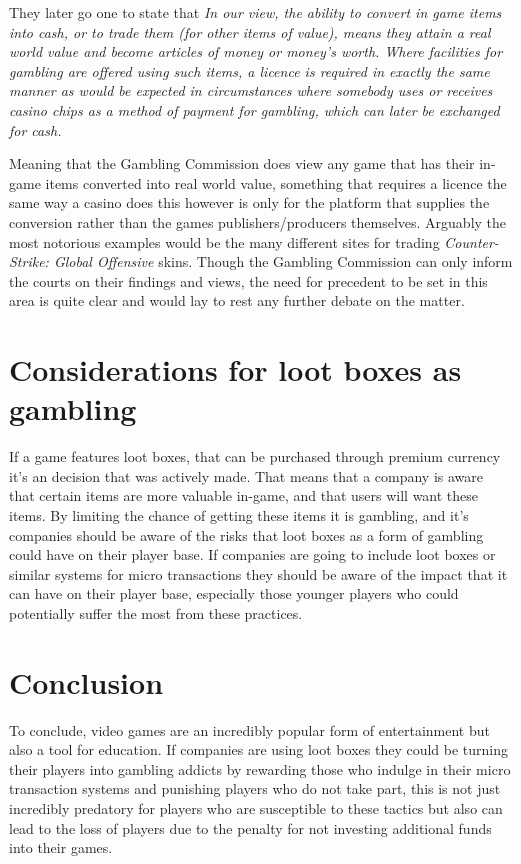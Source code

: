 \documentclass{scrartcl}
\begin{document}
They later go one to state that \newline \newline \textit {In our view, the ability to convert in game items into cash, or to trade them (for other items of value), means they attain a real world value and become articles of money or money’s worth. Where facilities for gambling are offered using such items, a licence is required in exactly the same manner as would be expected in circumstances where somebody uses or receives casino chips as a method of payment for gambling, which can later be exchanged for cash.}  \newline

Meaning that the Gambling Commission does view any game that has their in-game items converted into real world value, something that requires a licence the same way a casino does this however is only for the platform that supplies the conversion rather than the games publishers/producers themselves. Arguably the most notorious examples would be the many different sites for trading \textit {Counter-Strike: Global Offensive} \cite{valve2012CS} skins. Though the Gambling Commission can only inform the courts on their findings and views, the need for precedent to be set in this area is quite clear and would lay to rest any further debate on the matter.

\section{Considerations for loot boxes as gambling}
If a game features loot boxes, that can be purchased through premium currency it's an decision that was actively made. That means that a company is aware that certain items are more valuable in-game, and that users will want these items. By limiting the chance of getting these items it is gambling, and it's companies should be aware of the risks that loot boxes as a form of gambling could have on their player base. \cite{griffiths2000risk, johansson2009risk, chambers2003developmental} If companies are going to include loot boxes or similar systems for micro transactions they should be aware of the impact that it can have on their player base, especially those younger players who could potentially suffer the most from these practices.

\section{Conclusion}
To conclude, video games are an incredibly popular form of entertainment but also a tool for education. If companies are using loot boxes they could be turning their players into gambling addicts by rewarding those who indulge in their micro transaction systems and punishing players who do not take part, this is not just incredibly predatory for players who are susceptible to these tactics but also can lead to the loss of players due to the penalty for not investing additional funds into their games.



\end{document}
